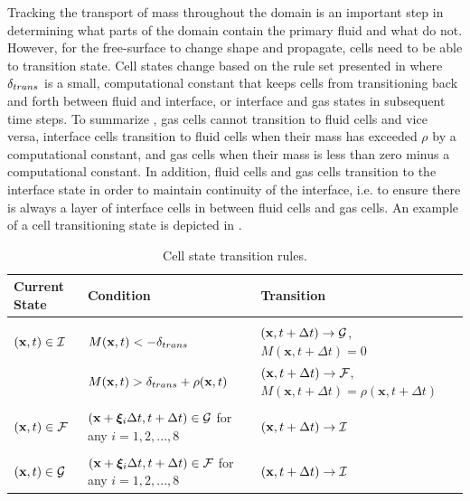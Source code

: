 \documentclass[pdftex,ms]{pittetd}
\newcommand{\pos}{\mathbf{x}}
\newcommand{\pvel}{\boldsymbol{\xi}}
\begin{document}
Tracking the transport of mass throughout the domain is an important step in determining what parts of the domain contain the primary fluid and what do not.
However, for the free-surface to change shape and propagate, cells need to be able to transition state.
Cell states change based on the rule set presented in  where $\delta_{trans}$ is a small, computational constant that keeps cells from transitioning back and forth between fluid and interface, or interface and gas states in subsequent time steps.
To summarize , gas cells cannot transition to fluid cells and vice versa, interface cells transition to fluid cells when their mass has exceeded $\rho$ by a computational constant, and gas cells when their mass is less than zero minus a computational constant.
In addition, fluid cells and gas cells transition to the interface state in order to maintain continuity of the interface, i.e. to ensure there is always a layer of interface cells in between fluid cells and gas cells.
An example of a cell transitioning state is depicted in .

\begin{table}
\caption{Cell state transition rules.}
\begin{tabulary}{\linewidth}{l|L|L}
\textbf{Current State} & \textbf{Condition} & \textbf{Transition} \\
\hline &  & \\
$(\pos, t) \in \iset$ & $M(\pos, t) < -\tconst$ & $(\pos, t + \Delta t) \rightarrow \gset$, $M(\pos, t + \Delta t) = 0$ \\
                      & $M(\pos, t) > \tconst + \rho(\pos, t)$ & $(\pos, t + \Delta t) \rightarrow \fset$, $M(\pos, t + \Delta t) = \rho(\pos, t + \Delta t)$ \\
                      &\\
$(\pos, t) \in \fset$ & $(\pos + \pvel_i \Delta t, t + \Delta t) \in \gset$ for any $i = 1, 2, ..., 8$ & $(\pos, t + \Delta t) \rightarrow \iset$ \\
&\\
$(\pos, t) \in \gset$ & $(\pos + \pvel_i \Delta t, t + \Delta t) \in \fset$ for any $i = 1, 2, ..., 8$ & $(\pos, t + \Delta t) \rightarrow \iset$ \\
\end{tabulary}
\label{tab:cell-transition-rules}
\end{table}
\end{document}
